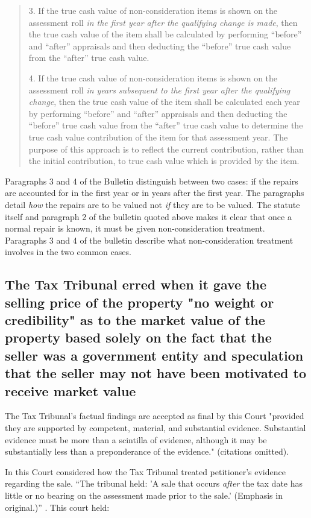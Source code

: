 \documentclass[12pt,\documentclassflag]{michiganCourtOfAppealsBrief}
\begin{document}
\begin{quotation}
3. If the true cash value of non-consideration items is shown on the assessment roll \textit{in the first year after the qualifying change is made}, then the true cash value of the item shall be calculated by performing “before” and “after” appraisals and then deducting the “before” true cash value from the “after” true cash value.

4. If the true cash value of non-consideration items is shown on the assessment roll \textit{in years subsequent to the first year after the qualifying change}, then the true cash value of the item shall be calculated each year by performing “before” and “after” appraisals and then deducting the “before” true cash value from the “after” true cash value to determine the true cash value contribution of the item for that assessment year. The purpose of this approach is to reflect the current contribution, rather than the initial contribution, to true cash value which is provided by the item.
\end{quotation}

Paragraphs 3 and 4 of the Bulletin distinguish between two cases: if the repairs are accounted for in the first year or in years after the first year. The paragraphs detail \textit{how} the repairs are to be valued not \textit{if} they are to be valued. The statute itself and paragraph 2 of the bulletin quoted above makes it clear that once a normal repair is known, it must be given non-consideration treatment. Paragraphs 3 and 4 of the bulletin describe what non-consideration treatment involves in the two common cases.

\subsection{The Tax Tribunal erred when it gave the selling price of the property "no weight or credibility" as to the market value of the property based solely on the fact that the seller was a government entity and speculation that the seller may not have been motivated to receive market value}

The Tax Tribunal's factual findings are accepted as final by this Court "provided they are supported by competent, material, and substantial evidence. Substantial evidence must be more than a scintilla of evidence, although it may be substantially less than a preponderance of the evidence."  (citations omitted).

In \cite[s]{Jones & Laughlin} this Court considered how the Tax Tribunal treated petitioner's evidence regarding the sale. “The tribunal held: 'A sale that occurs \textit{after} the tax date has little or no bearing on the assessment made prior to the sale.' (Emphasis in original.)” . This court held:
\end{document}
